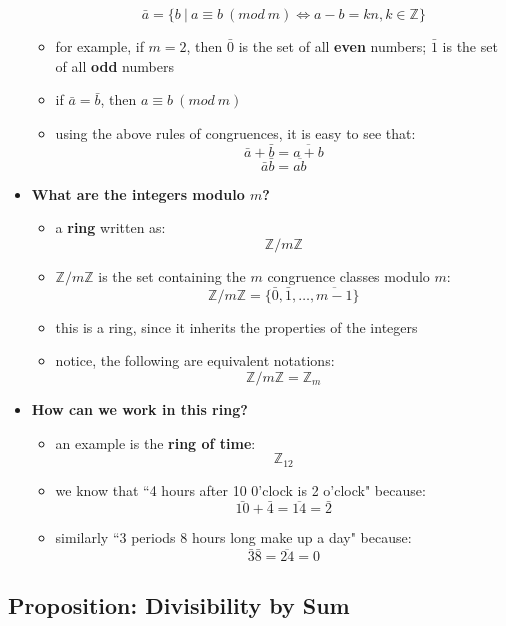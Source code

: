 \documentclass{exam}
\begin{document}
\begin{itemize}
\begin{itemize}
        \[
        \bar{a} = \{b \ | \ a \equiv b \ (mod \ m) \iff a - b = kn, k \in \mathbb{Z}\}
        \]
        \item for example, if $m = 2$, then $\bar{0}$ is the set of all \textbf{even} numbers; $\bar{1}$ is the set of all \textbf{odd} numbers
        \item if $\bar{a} = \bar{b}$, then $a \equiv b \ (mod \ m)$
        \item using the above rules of congruences, it is easy to see that:
        \[
        \bar{a} + \bar{b} = \overline{a + b}
        \]
        \[
        \bar{a}\bar{b} = \overline{ab}
        \]
    \end{itemize}
        \item \textbf{What are the integers modulo $m$?}
    \begin{itemize}
        \item a \textbf{ring} written as:
        \[
        \mathbb{Z}/m\mathbb{Z}
        \]
        \item $\mathbb{Z}/m\mathbb{Z}$ is the set containing the $m$ congruence classes modulo $m$:
        \[
        \mathbb{Z}/m\mathbb{Z} = \{\bar{0}, \bar{1}, \ldots, \overline{m-1}\}
        \]
        \item this is a ring, since it inherits the properties of the integers
        \item notice, the following are equivalent notations:
        \[
        \mathbb{Z}/m\mathbb{Z} = \mathbb{Z}_m
        \]
    \end{itemize}
    \item \textbf{How can we work in this ring?}
    \begin{itemize}
        \item an example is the \textbf{ring of time}:
        \[
        \mathbb{Z}_{12}
        \]
        \item we know that ``4 hours after 10 0'clock is 2 o'clock" because:
        \[
        \bar{10} + \bar{4} = \overline{14} = \bar{2}
        \]
        \item similarly ``3 periods 8 hours long make up a day" because:
        \[
        \bar{3}\bar{8} = \overline{24} = 0
        \]
    \end{itemize}
\end{itemize}

\subsection{Proposition: Divisibility by Sum}
\end{document}

